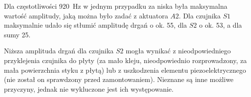 \documentclass[polish,a4paper,11pt]{mwart}
\begin{document}
Dla częstotliwości \SI{920}{\hertz} w jednym przypadku  za niska była
maksymalna wartość amplitudy, jaką można było zadać z aktuatora $A2$. Dla
czujnika $S1$ maksymalnie udało się stłumić amplitudę drgań o ok.
\SI{55}{\decibelV}, dla $S2$ o ok.  \SI{53}{\decibelV}, a dla sumy
\SI{25}{\decibelV}.

Niższa amplituda drgań dla czujnika $S2$ mogła wynikać z nieodpowiedniego
przyklejenia czujnika do płyty (za mało kleju, nieodpowiednio rozprowadzony, za
mała powierzchnia styku z płytą) lub z uszkodzenia elementu piezoelektrycznego
(nie został on sprawdzony przed zamontowaniem). Nieznane są inne możliwe
przyczyny, jednak nie wykluczone jest ich występowanie.
\end{document}
